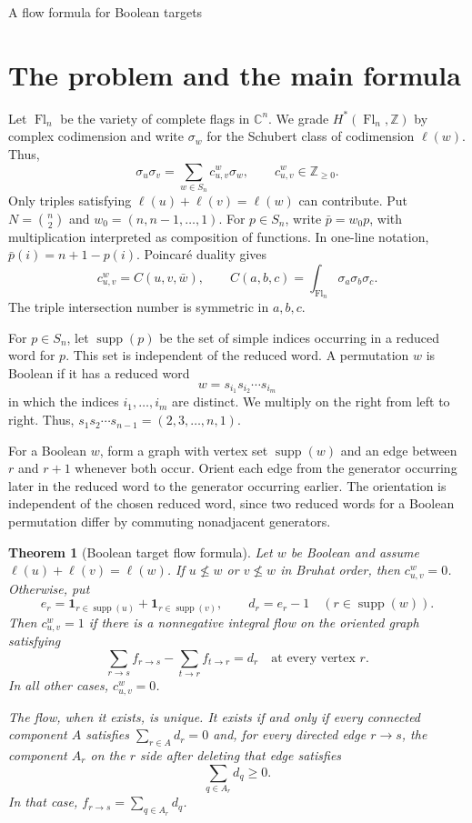 \documentclass[11pt]{article}
\newtheorem{theorem}{Theorem}[section]
\newcommand{\Fl}{\operatorname{Fl}}
\newcommand{\supp}{\operatorname{supp}}
\begin{document}
\begin{center}\Large A flow formula for Boolean targets\end{center}
\section{The problem and the main formula}

Let $\Fl_n$ be the variety of complete flags in $\mathbb C^n$. We grade $H^*(\Fl_n,\mathbb Z)$ by complex codimension and write $\sigma_w$ for the Schubert class of codimension $\ell(w)$. Thus,
\[
 \sigma_u\sigma_v=\sum_{w\in S_n}c_{u,v}^{w}\sigma_w,
 \qquad c_{u,v}^{w}\in\mathbb Z_{\geq0}.
\]
Only triples satisfying $\ell(u)+\ell(v)=\ell(w)$ can contribute. Put $N=\binom n2$ and $w_0=(n,n-1,\ldots,1)$. For $p\in S_n$, write $\bar p=w_0p$, with multiplication interpreted as composition of functions. In one-line notation, $\bar p(i)=n+1-p(i)$. Poincar\'e duality gives
\begin{equation}\label{eq:triple}
 c_{u,v}^{w}=C(u,v,\bar w),
 \qquad C(a,b,c)=\int_{\Fl_n}\sigma_a\sigma_b\sigma_c.
\end{equation}
The triple intersection number is symmetric in $a,b,c$.

For $p\in S_n$, let $\supp(p)$ be the set of simple indices occurring in a reduced word for $p$. This set is independent of the reduced word. A permutation $w$ is Boolean if it has a reduced word
\[
 w=s_{i_1}s_{i_2}\cdots s_{i_m}
\]
in which the indices $i_1,\ldots,i_m$ are distinct. We multiply on the right from left to right. Thus, $s_1s_2\cdots s_{n-1}=(2,3,\ldots,n,1)$.

For a Boolean $w$, form a graph with vertex set $\supp(w)$ and an edge between $r$ and $r+1$ whenever both occur. Orient each edge from the generator occurring later in the reduced word to the generator occurring earlier. The orientation is independent of the chosen reduced word, since two reduced words for a Boolean permutation differ by commuting nonadjacent generators.

\begin{theorem}[Boolean target flow formula]\label{thm:boolean}
Let $w$ be Boolean and assume $\ell(u)+\ell(v)=\ell(w)$. If $u\not\leq w$ or $v\not\leq w$ in Bruhat order, then $c_{u,v}^{w}=0$. Otherwise, put
\[
 e_r=\mathbf 1_{r\in\supp(u)}+\mathbf 1_{r\in\supp(v)},
 \qquad d_r=e_r-1
 \quad (r\in\supp(w)).
\]
Then $c_{u,v}^{w}=1$ if there is a nonnegative integral flow on the oriented graph satisfying
\begin{equation}\label{eq:flow}
 \sum_{r\to s}f_{r\to s}-\sum_{t\to r}f_{t\to r}=d_r
 \quad\text{at every vertex }r.
\end{equation}
In all other cases, $c_{u,v}^{w}=0$.

The flow, when it exists, is unique. It exists if and only if every connected component $A$ satisfies $\sum_{r\in A}d_r=0$ and, for every directed edge $r\to s$, the component $A_r$ on the $r$ side after deleting that edge satisfies
\begin{equation}\label{eq:cut}
 \sum_{q\in A_r}d_q\geq0.
\end{equation}
In that case, $f_{r\to s}=\sum_{q\in A_r}d_q$.
\end{theorem}
\end{document}
